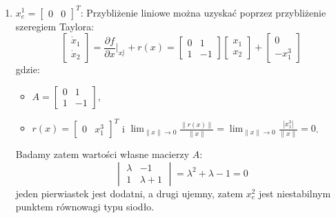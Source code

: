 \documentclass{article}
\begin{document}
        \begin{enumerate}
            \item $x_{e}^{1} = \begin{bmatrix} 0 & 0 \end{bmatrix}^{T}$:
            Przybliżenie liniowe można uzyskać poprzez przybliżenie szeregiem Taylora:
            $$
                \begin{bmatrix} \dot{x}_{1} \\ \dot{x}_{2} \end{bmatrix}
                =
                \frac{\partial f}{\partial x}|_{x_{e}^{1}} + r(x)
                =
                \begin{bmatrix} 0 & 1 \\ 1 & -1 \end{bmatrix}
                \begin{bmatrix} x_{1} \\ x_{2} \end{bmatrix}
                +
                \begin{bmatrix} 0 \\ -x_{1}^{3} \end{bmatrix}
            $$
            gdzie:
            \begin{itemize}
                \item $A = \begin{bmatrix} 0 & 1 \\ 1 & -1 \end{bmatrix}$,
                \item $r(x) = \begin{bmatrix} 0 & x_{1}^{3} \end{bmatrix}^{T}$ i $\lim_{\lVert x \rVert \rightarrow 0}\frac{\lVert r(x) \rVert}{\lVert x \rVert} = \lim_{\lVert x \rVert \rightarrow 0}\frac{|x_{1}^{3}|}{\lVert x \rVert} = 0$.
            \end{itemize}
            Badamy zatem wartości własne macierzy $A$:
            $$
                \begin{vmatrix} \lambda & -1\\ 1 & \lambda + 1 \end{vmatrix} = \lambda^{2} + \lambda - 1 = 0
            $$
            jeden pierwiastek jest dodatni, a drugi ujemny, zatem $x_{e}^{2}$ jest niestabilnym punktem równowagi typu siodło.
            

\end{enumerate}
\end{document}
